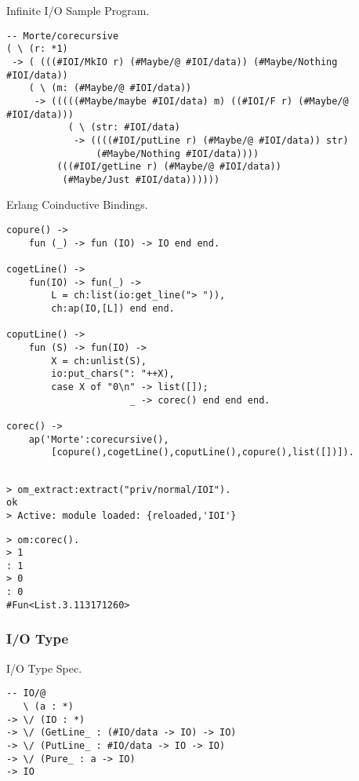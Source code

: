 Infinite I/O Sample Program.

\begin{lstlisting}[mathescape=true]
-- Morte/corecursive
( \ (r: *1)
 -> ( (((#IOI/MkIO r) (#Maybe/@ #IOI/data)) (#Maybe/Nothing #IOI/data))
    ( \ (m: (#Maybe/@ #IOI/data))
     -> (((((#Maybe/maybe #IOI/data) m) ((#IOI/F r) (#Maybe/@ #IOI/data)))
           ( \ (str: #IOI/data)
            -> ((((#IOI/putLine r) (#Maybe/@ #IOI/data)) str)
                (#Maybe/Nothing #IOI/data))))
         (((#IOI/getLine r) (#Maybe/@ #IOI/data))
          (#Maybe/Just #IOI/data))))))
\end{lstlisting}

Erlang Coinductive Bindings.

\begin{lstlisting}[mathescape=true]
copure() ->
    fun (_) -> fun (IO) -> IO end end.

cogetLine() ->
    fun(IO) -> fun(_) ->
        L = ch:list(io:get_line("> ")),
        ch:ap(IO,[L]) end end.

coputLine() ->
    fun (S) -> fun(IO) ->
        X = ch:unlist(S),
        io:put_chars(": "++X),
        case X of "0\n" -> list([]);
                      _ -> corec() end end end.

corec() ->
    ap('Morte':corecursive(),
        [copure(),cogetLine(),coputLine(),copure(),list([])]).
\end{lstlisting}

\begin{lstlisting}[mathescape=true]

> om_extract:extract("priv/normal/IOI").
ok
> Active: module loaded: {reloaded,'IOI'}
\end{lstlisting}

\begin{lstlisting}[mathescape=true]
> om:corec().
> 1
: 1
> 0
: 0
#Fun<List.3.113171260>
\end{lstlisting}

\subsubsection{I/O Type}

I/O Type Spec.

\begin{lstlisting}[mathescape=true]
-- IO/@
   \ (a : *)
-> \/ (IO : *)
-> \/ (GetLine_ : (#IO/data -> IO) -> IO)
-> \/ (PutLine_ : #IO/data -> IO -> IO)
-> \/ (Pure_ : a -> IO)
-> IO
\end{lstlisting}

